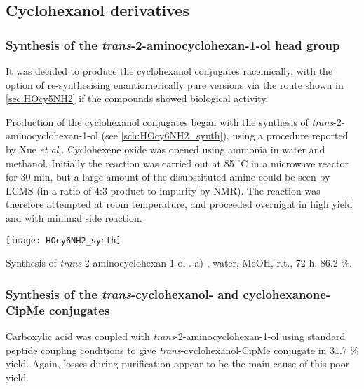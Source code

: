 \subsection{Cyclohexanol derivatives}

\subsubsection{Synthesis of the \textit{trans}-2-aminocyclohexan-1-ol head group}

It was decided to produce the cyclohexanol conjugates racemically, with the option of re-synthesising enantiomerically pure versions via the route shown in \ref{sec:HOcy5NH2} if the compounds showed biological activity.

Production of the cyclohexanol conjugates began with the synthesis of \textit{trans}-2-aminocyclohexan-1-ol  (see \ref{sch:HOcy6NH2_synth}), using a procedure reported by Xue \textit{et al.}\cite{Xue2006}.
Cyclohexene oxide  was opened using ammonia in water and methanol. Initially the reaction was carried out at 85 $^{\circ}$C in a microwave reactor for 30 min, but a large amount of the disubstituted amine could be seen by LCMS (in a ratio of 4:3 product to impurity by NMR). The reaction was therefore attempted at room temperature, and proceeded overnight in high yield and with minimal side reaction.

\begin{scheme}[H]
	\begin{center}
		\texttt{[image: HOcy6NH2\_synth]}
		\caption{Synthesis of \textit{trans}-2-aminocyclohexan-1-ol .
		a) , water, MeOH, r.t., 72 h, 86.2 \%.
		\label{sch:HOcy6NH2_synth}}
	\end{center}
\end{scheme}

\subsubsection{Synthesis of the \textit{trans}-cyclohexanol- and cyclohexanone-CipMe conjugates\label{sec:Ocy6}}

Carboxylic acid  was coupled with \textit{trans}-2-aminocyclohexan-1-ol  using standard peptide coupling conditions to give \textit{trans}-cyclohexanol-CipMe conjugate  in 31.7 \% yield. Again, losses during purification appear to be the main cause of this poor yield.

